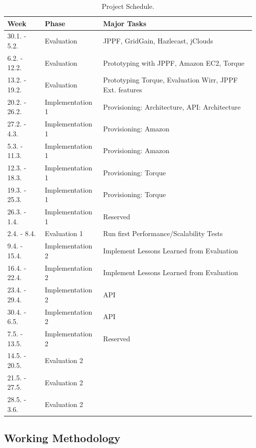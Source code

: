 \documentclass[english]{uzhpub}
\begin{document}
\begin{table}[hptb]
\centering
\begin{tabular}{|l|l|p{7cm}|}
\hline
\textbf{Week} & \textbf{Phase} & \textbf{Major Tasks} \\ \hline
30.1. - 5.2. & Evaluation & JPPF, GridGain, Hazlecast, jClouds \\ \hline
6.2. - 12.2. & Evaluation & Prototyping with JPPF, Amazon EC2, Torque \\ \hline
13.2. - 19.2. & Evaluation & Prototyping Torque, Evaluation Wirr, JPPF Ext. features \\ \hline
20.2. - 26.2. & Implementation 1 & Provisioning: Architecture, API: Architecture \\ \hline
27.2. - 4.3. & Implementation 1 & Provisioning: Amazon \\ \hline
5.3. - 11.3. & Implementation 1 & Provisioning: Amazon \\ \hline
12.3. - 18.3. & Implementation 1 & Provisioning: Torque \\ \hline
19.3. - 25.3. & Implementation 1 & Provisioning: Torque \\ \hline
26.3. - 1.4. & Implementation 1 & Reserved \\ \hline
2.4. - 8.4. & Evaluation 1 & Run first Performance/Scalability Tests \\ \hline
9.4. - 15.4. & Implementation 2 & Implement Lessons Learned from Evaluation \\ \hline
16.4. - 22.4. & Implementation 2 & Implement Lessons Learned from Evaluation \\ \hline
23.4. - 29.4. & Implementation 2 & API \\ \hline
30.4. - 6.5. & Implementation 2 & API \\ \hline
7.5. - 13.5. & Implementation 2 & Reserved \\ \hline
14.5. - 20.5. & Evaluation 2 &  \\ \hline
21.5. - 27.5. & Evaluation 2 &  \\ \hline
28.5. - 3.6. & Evaluation 2 &  \\ \hline
\end{tabular}
\caption{Project Schedule.}
\label{tab:schedule}
\end{table}

\subsection{Working Methodology}
\end{document}
